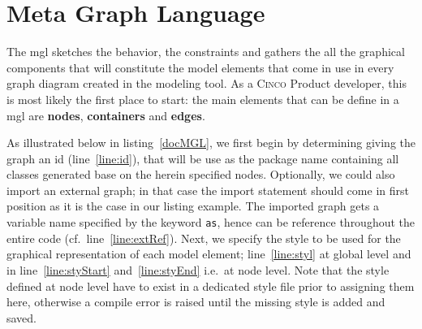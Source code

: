 \section{Meta Graph Language}\label{sec:MGL}

The \acrfull{mgl} sketches the behavior, the constraints and gathers the all the graphical components that will constitute the model elements that come in use in every graph diagram created in the modeling tool. As a \textsc{Cinco} Product developer, this is most likely the first place to start: the main elements that can be define in a \acrshort{mgl} are \textbf{nodes}, \textbf{containers} and \textbf{edges}. 

As illustrated below in listing~\ref{docMGL}, we first begin by determining giving the graph an id (line~\ref{line:id}), that will be use as the package name containing all classes generated base on the herein specified nodes. Optionally, we could also import an external graph; in that case the import statement should come in first position as it is the case in our listing example. The imported graph gets a variable name specified by the keyword \lstinline[language=MGL]{as}, hence can be reference throughout the entire code (cf.\ line~\ref{line:extRef}). Next, we specify the style to be used for the graphical representation of each model element; line~\ref{line:styl} at global level and in line~\ref{line:styStart} and~\ref{line:styEnd} i.e.\ at node level. Note that the style defined at node level have to exist in a dedicated style file prior to assigning them here, otherwise a compile error is raised until the missing style is added and saved.

